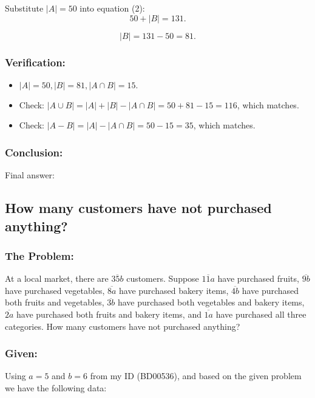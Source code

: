\documentclass[12pt, a4paper, twoside]{report} %
\begin{document}
  Substitute \( |A| = 50 \) into equation (2):
  \[
  50 + |B| = 131.
  \]

  \[
  |B| = 131 - 50 = 81.
  \]

\subsubsection*{Verification:}
  \begin{itemize}
    \item $|A|=50, |B|=81,|A\cap B|=15.$
    \item Check: $|A \cup B| = |A| + |B| - |A \cap B| = 50 + 81 - 15 = 116$, which matches.
    \item Check: $|A - B| = |A| - |A \cap B| = 50 - 15 = 35$, which matches.
  \end{itemize}

\subsubsection*{Conclusion:}
Final answer: 

\subsection{How many customers have not purchased anything?}

\subsubsection*{The Problem:}
At a local market, there are $\overline {35b}$ customers. Suppose $\overline {11a}$ have purchased fruits, $\overline {9b}$ have purchased vegetables, $\overline {8a}$ have purchased bakery items, $\overline{4b}$ have purchased both fruits and vegetables, $\overline{3b}$ have purchased both vegetables and bakery items, $\overline{2a}$ have purchased both fruits and bakery items, and $\overline{1a}$ have purchased all three categories. How many customers have not purchased anything?
\subsubsection*{Given:}
  Using \(a = 5\) and \(b = 6\) from my ID (BD00536), and based on the given problem we have the following data:
\end{document}
